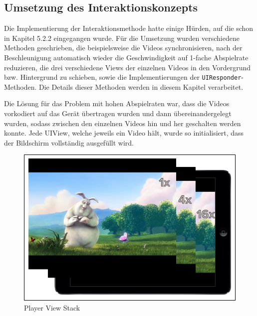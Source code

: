 \documentclass[11pt,a4paper]{report}
\begin{document}
\subsection{Umsetzung des Interaktionskonzepts}

Die Implementierung der Interaktionsmethode hatte einige Hürden, auf die schon in Kapitel 5.2.2 eingegangen wurde. Für die Umsetzung wurden verschiedene Methoden geschrieben, die beispielsweise die Videos synchronisieren, nach der Beschleunigung automatisch wieder die Geschwindigkeit auf 1-fache Abspielrate reduzieren, die drei verschiedene Views der einzelnen Videos in den Vordergrund bzw. Hintergrund zu schieben, sowie die Implementierungen der \texttt{UIResponder}-Methoden. Die Details dieser Methoden werden in diesem Kapitel verarbeitet.

Die Lösung für das Problem mit hohen Abspielraten war, dass die Videos vorkodiert auf das Gerät übertragen wurden und dann übereinandergelegt wurden, sodass zwischen den einzelnen Videos hin und her geschalten werden konnte. Jede UIView, welche jeweils ein Video hält, wurde so initialisiert, dass der Bildschirm vollständig ausgefüllt wird.
\begin{figure}[h]
\begin{center}
\includegraphics[scale=1.1]{./images/28.png}
\caption{Player View Stack}
\label{player_view_stack}
\end{center}
\end{figure}
\end{document}
